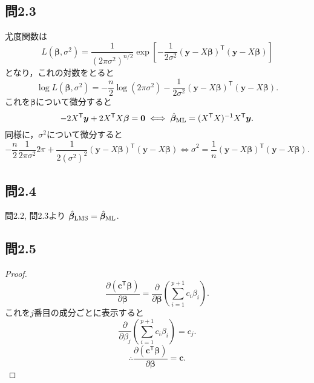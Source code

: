\documentclass[pdflatex,ja=standard]{bxjsarticle}
\begin{document}
\subsection{問2.3}
尤度関数は
\begin{equation}
L(\bm{\beta}, \sigma^2) = \frac{1}{(2 \pi \sigma^2)^{n/2}} \exp \left[ -\frac{1}{2 \sigma^2} (\bm{y} - X \bm{\beta})^{\mathsf{T}} (\bm{y} - X \bm{\beta}) \right]
\end{equation}
となり，これの対数をとると
\begin{equation}
\log L(\bm{\beta}, \sigma^2) = - \frac{n}{2} \log (2 \pi \sigma^2)  -\frac{1}{2 \sigma^2} (\bm{y} - X \bm{\beta})^{\mathsf{T}} (\bm{y} - X \bm{\beta}) .
\end{equation}
これを$\bm{\beta}$について微分すると
\begin{equation}
- 2 X^{\mathsf{T}} \bm{y} + 2 X^{\mathsf{T}}X \bm{\beta} = \bm{0}
\iff \hat{\bm{\beta}}_{\rm{ML}} = (X^{\mathsf{T}} X)^{-1} X^{\mathsf{T}} \bm{y}.
\end{equation}
同様に，$\sigma^2$について微分すると
\begin{equation}
- \frac{n}{2} \frac{1}{2 \pi \sigma^2}  2 \pi + \frac{1}{2 (\sigma^2)^2} (\bm{y} - X \bm{\beta})^{\mathsf{T}} (\bm{y} - X \bm{\beta})
\iff \hat{\sigma}^2 = \frac{1}{n} (\bm{y} - X \bm{\beta})^{\mathsf{T}} (\bm{y} - X \bm{\beta}).
\end{equation}

\subsection{問2.4}
問2.2, 問2.3より $\hat{\bm{\beta}}_{\rm{LMS}} = \hat{\bm{\beta}}_{\rm{ML}}$. 

\subsection{問2.5}
\begin{proof}
\begin{equation}
\frac{\partial (\bm{c}^{\mathsf{T}} \bm{\beta})}{\partial \bm{\beta}} = \frac{\partial }{\partial \bm{\beta}} \left( \sum_{i=1}^{p+1} c_i \beta_i \right).
\end{equation}
これを$j$番目の成分ごとに表示すると
\begin{equation}
\frac{\partial }{\partial \beta_j} \left( \sum_{i=1}^{p+1} c_i \beta_i \right) = c_j.
\end{equation}
\begin{equation}
\therefore \frac{\partial (\bm{c}^{\mathsf{T}} \bm{\beta})}{\partial \bm{\beta}} = \bm{c}.
\end{equation}
\end{proof}
\end{document}
